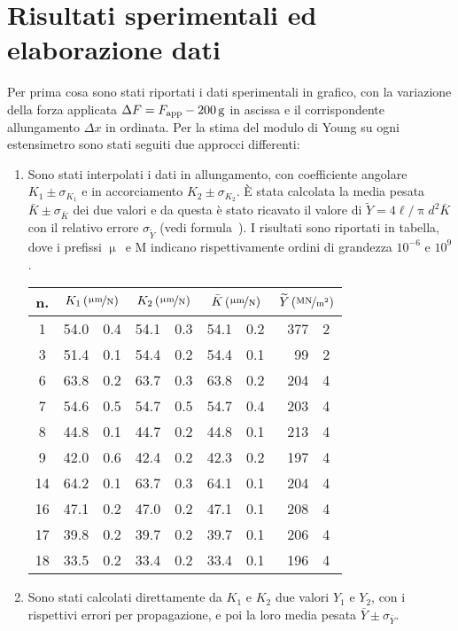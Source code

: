 \documentclass[italian,a4paper]{article}
\newcommand{\micro}{\ensuremath{\upmu}} %
\renewcommand{\pi}{\uppi} %
\begin{document}
\section{Risultati sperimentali ed elaborazione dati}
Per prima cosa sono stati riportati i dati sperimentali in grafico, con la variazione della forza applicata $\Delta F = F_{\mathrm{app}}-\unit[200]{g}$ in ascissa e il corrispondente allungamento $\Delta x$ in ordinata. Per la stima del modulo di Young su ogni estensimetro sono stati seguiti due approcci differenti:
\begin{enumerate}
 \item Sono stati interpolati i dati in allungamento, con coefficiente angolare $K_1 \pm \sigma_{K_1}$ e in accorciamento $K_2 \pm \sigma_{K_2}$. \`E stata calcolata la media pesata $\bar{K}\pm\sigma_{\bar{K}}$ dei due valori e da questa è stato ricavato il valore di $\widetilde{Y}=4\ell/\pi d^2 \bar{K}$ con il relativo errore $\sigma_{\widetilde{Y}}$ (vedi formula~{}). I risultati sono riportati in tabella, dove i prefissi \micro\ e M indicano rispettivamente ordini di grandezza $10^{-6}$ e $10^9$.\\
\begin{table}[h]
\centering
 \begin{tabular}{c *4{r@{$\pm$}l}}
  n. &  \multicolumn{2}{c}{$K_1\,(\unitfrac{\micro m}{N})$}&
\multicolumn{2}{c}{$K_2\,(\unitfrac{\micro m}{N})$}&
\multicolumn{2}{c}{$\bar{K}\,(\unitfrac{\micro m}{N})$}&
\multicolumn{2}{c}{$\widetilde{Y}\,(\unitfrac{MN}{m^2})$}\\\hline
1  & 54.0&0.4 &54.1&0.3 &54.1&0.2 &377&2\\
3  & 51.4&0.1 &54.4&0.2 &54.4&0.1 & 99&2\\
6  & 63.8&0.2 &63.7&0.3 &63.8&0.2 &204&4\\
7  & 54.6&0.5 &54.7&0.5 &54.7&0.4 &203&4\\
8  & 44.8&0.1 &44.7&0.2 &44.8&0.1 &213&4\\
9  & 42.0&0.6 &42.4&0.2 &42.3&0.2 &197&4\\
14 & 64.2&0.1 &63.7&0.3 &64.1&0.1 &204&4\\
16 & 47.1&0.2 &47.0&0.2 &47.1&0.1 &208&4\\
17 & 39.8&0.2 &39.7&0.2 &39.7&0.1 &206&4\\
18 & 33.5&0.2 &33.4&0.2 &33.4&0.1 &196&4\\
 \end{tabular}
\end{table}
\item Sono stati calcolati direttamente da $K_1$ e $K_2$ due valori $Y_1$ e $Y_2$, con i rispettivi errori per propagazione, e poi la loro media pesata $\bar{Y}\pm\sigma_{\bar{Y}}$.\\

\end{enumerate}
\end{document}
